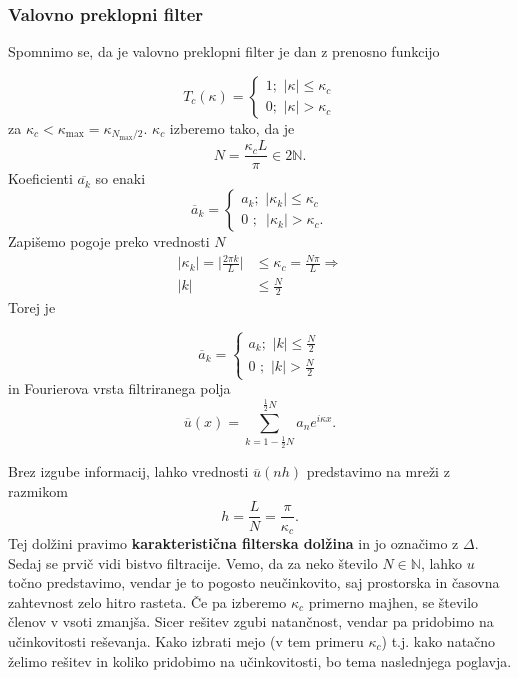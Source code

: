\documentclass[mat2, tisk]{fmfdelo}
\newcommand{\N}{\mathbb N}
\begin{document}
\subsubsection{Valovno preklopni filter}

Spomnimo se, da je valovno preklopni filter je dan z prenosno funkcijo 

$$
T_c(\kappa)=\begin{cases}
  1 ;\,\, |\kappa| \leq \kappa_c \\
  0 ;\,\, |\kappa| > \kappa_c
\end{cases}
$$
za $\kappa_c < \kappa_\text{max} = \kappa_{N_\text{max}/2}$. $\kappa_c$
izberemo tako, da je 
$$
N = \frac{\kappa_c L}{\pi} \in 2\N.
$$
Koeficienti $\overline{a_k}$ so enaki 
$$
\overline{a}_k=\begin{cases}
  a_k ;\,\, |\kappa_k| \leq \kappa_c \\
  0 \,\,;\,\,\, |\kappa_k| > \kappa_c.
\end{cases}
$$
Zapišemo pogoje preko vrednosti $N$
\begin{align*}
|\kappa_k| = \Big| \frac{2\pi k}{L} \Big| &\leq \kappa_c = \frac{N\pi}{L} \Longrightarrow\\[1mm]
|k| &\leq \frac{N}{2}
\end{align*}
Torej je

$$
\overline{a}_k= \begin{cases}a_k ;\,\, |k| \leq \frac{N}{2} \\ 0 \,\,;\,\, |k| > \frac{N}{2}\end{cases}
$$
in Fourierova vrsta filtriranega polja 
\begin{equation}
\label{Fourier_število}
\overline{u}(x) = \sum_{k = 1 - \frac{1}{2}N}^{\frac{1}{2}N} a_n e^{i\kappa x}.
\end{equation}

Brez izgube informacij, lahko vrednosti $\overline{u}(nh)$ predstavimo na mreži 
z razmikom 
\begin{equation}
h = \frac{L}{N} = \frac{\pi}{\kappa_c}.
\end{equation}
Tej dolžini pravimo \textbf{karakteristična filterska dolžina} in jo 
označimo z $\Delta$. 
\noindent
Sedaj se prvič vidi bistvo filtracije. Vemo, da za neko število 
$N\in \N$, lahko $u$ točno predstavimo, vendar je to pogosto neučinkovito, 
saj prostorska in časovna zahtevnost zelo hitro rasteta. Če pa izberemo
$\kappa_c$ primerno majhen, se število členov v vsoti zmanjša.
Sicer rešitev zgubi natančnost, vendar pa pridobimo na učinkovitosti reševanja. 
Kako izbrati mejo (v tem primeru $\kappa_c$) t.j. kako natačno želimo 
rešitev in koliko pridobimo na učinkovitosti, bo tema naslednjega poglavja.
\end{document}
